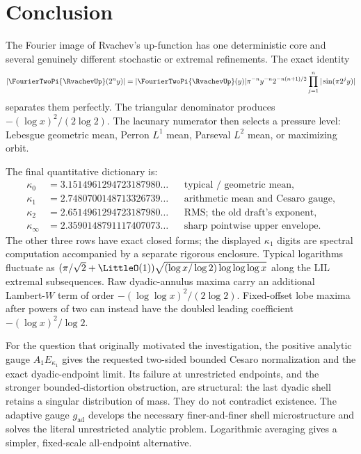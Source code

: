 \documentclass[11pt,oneside]{article}
\numberwithin{equation}{section}
\theoremstyle{definition}
\theoremstyle{remark}
\begin{document}
\section{Conclusion}
\label{sec:conclusion}

The Fourier image of Rvachev's up-function has one deterministic core and several genuinely
different stochastic or extremal refinements.  The exact identity
\[
 |\FourierTwoPi{\RvachevUp}(2^ny)|
 =|\FourierTwoPi{\RvachevUp}(y)|\pi^{-n}y^{-n}2^{-n(n+1)/2}
 \prod_{j=1}^n|\sin(\pi2^jy)|
\]
separates them perfectly.  The triangular denominator produces
$-(\log x)^2/(2\log2)$.  The lacunary numerator then selects a pressure level:
Lebesgue geometric mean, Perron $L^1$ mean, Parseval $L^2$ mean, or maximizing orbit.

The final quantitative dictionary is:
\begin{align*}
 \kappa_0&=3.1514961294723187980\ldots &&\text{typical / geometric mean},\\
 \kappa_1&=2.7480700148713326739\ldots &&\text{arithmetic mean and Cesaro gauge},\\
 \kappa_2&=2.6514961294723187980\ldots &&\text{RMS; the old draft's exponent},\\
 \kappa_\infty&=2.3590148791117407073\ldots &&\text{sharp pointwise upper envelope}.
\end{align*}
The other three rows have exact closed forms; the displayed $\kappa_1$ digits are spectral
computation accompanied by a separate rigorous enclosure.
Typical logarithms fluctuate as
$(\pi/\sqrt2+\LittleO(1))\sqrt{(\log x/\log2)\log\log\log x}$ along the LIL extremal
subsequences.
Raw dyadic-annulus maxima carry an additional Lambert-$W$ term of order
$-(\log\log x)^2/(2\log2)$.  Fixed-offset lobe maxima after powers of two can instead have
the doubled leading coefficient $-(\log x)^2/\log2$.

For the question that originally motivated the investigation, the positive analytic gauge
$A_1E_{\kappa_1}$ gives the requested two-sided bounded Cesaro normalization and the exact
dyadic-endpoint limit.  Its failure at unrestricted endpoints, and the stronger
bounded-distortion obstruction, are structural: the last dyadic shell retains a singular
distribution of mass.  They do not contradict existence.  The adaptive gauge
$g_{\mathrm{ad}}$ develops the necessary finer-and-finer shell microstructure and solves the
literal unrestricted analytic problem.  Logarithmic averaging gives a simpler, fixed-scale
all-endpoint alternative.
\end{document}
